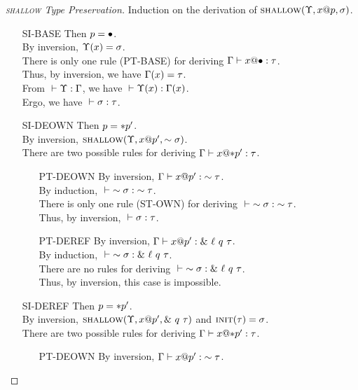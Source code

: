 \begin{proof}[\textsc{shallow} Type Preservation]
  Induction on the derivation of $\textsc{shallow}({\Upsilon},{{x}@{p}},{\sigma})$.
  \begin{itemize}
    \item[SI-BASE] Then $p = \bullet$. \\
      By inversion, $\Upsilon(x)=\sigma$. \\
      There is only one rule (\textsc{PT-BASE}) for deriving ${\Gamma} \vdash {{x}@{\bullet}} : {\tau}$. \\
      Thus, by inversion, we have $\Gamma(x)=\tau$. \\
      From ${} \vdash {\Upsilon} : {\Gamma}$, we have ${} \vdash {\Upsilon(x)} : {\Gamma(x)}$. \\
      Ergo, we have ${} \vdash {\sigma} : {\tau}$.
    \item[SI-DEOWN] Then $p = *{p'}$. \\
      By inversion, $\textsc{shallow}({\Upsilon},{{x}@{p'}},{\sim{\sigma}})$. \\
      There are two possible rules for deriving ${\Gamma} \vdash {{x}@{*{p'}}} : {\tau}$.
      \begin{itemize}
	\item[PT-DEOWN]
	  By inversion, ${\Gamma} \vdash {{x}@{p'}} : {\sim{\tau}}$. \\
	  By induction, ${} \vdash {\sim{\sigma}} : {\sim{\tau}}$. \\
	  There is only one rule (\textsc{ST-OWN}) for deriving ${} \vdash {\sim{\sigma}} : {\sim{\tau}}$. \\
	  Thus, by inversion, ${} \vdash {\sigma} : {\tau}$.
	\item[PT-DEREF]
	  By inversion, ${\Gamma} \vdash {{x}@{p'}} : {\&~{{\ell}~{q}~{\tau}}}$. \\
	  By induction, ${} \vdash {\sim{\sigma}} : {\&~{{\ell}~{q}~{\tau}}}$. \\
	  There are no rules for deriving ${} \vdash {\sim{\sigma}} : {\&~{{\ell}~{q}~{\tau}}}$. \\
	  Thus, by inversion, this case is impossible.
      \end{itemize}
    \item[SI-DEREF] Then $p = *{p'}$. \\
      By inversion, $\textsc{shallow}({\Upsilon},{{x}@{p'}},{\&~{{q}~{\tau}}})$ and $\textsc{init}({\tau})=\sigma$. \\
      There are two possible rules for deriving ${\Gamma} \vdash {{x}@{*{p'}}} : {\tau}$.
      \begin{itemize}
	\item[PT-DEOWN]
	  By inversion, ${\Gamma} \vdash {{x}@{p'}} : {\sim{\tau}}$. \\

\end{itemize}
\end{itemize}
\end{proof}
